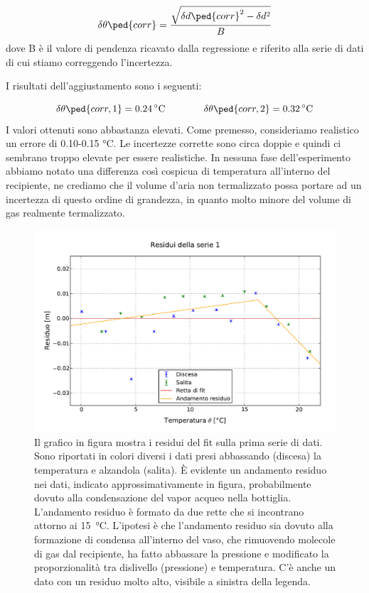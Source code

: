 \begin{equation}
    \delta \theta\ped{corr} = \frac{\sqrt{\delta d\ped{corr}^2 - \delta d^2}}{B}
    \label{eq:corr_err_theta}
\end{equation}
%
dove B è il valore di pendenza ricavato dalla regressione e riferito alla serie di dati di cui stiamo correggendo l'incertezza.

I risultati dell'aggiustamento sono i seguenti:

\begin{equation}
    \delta \theta\ped{corr,1} = \SI{0.24}{\celsius} \qquad \qquad \delta \theta\ped{corr,2} = \SI{0.32}{\celsius}
\end{equation}
%
I valori ottenuti sono abbastanza elevati. Come premesso, consideriamo realistico un errore di 0.10-0.15 \si{\celsius}.
Le incertezze corrette sono circa doppie e quindi ci sembrano troppo elevate per essere realistiche. In nessuna fase
dell'esperimento abbiamo notato una differenza così cospicua di temperatura all'interno del recipiente, ne crediamo che
il volume d'aria non termalizzato possa portare ad un incertezza di questo ordine di grandezza, in quanto molto minore
del volume di gas realmente termalizzato.

\begin{figure}[p]
    \centering
    \includegraphics[width=118mm]{immagini/fit1.pdf}
    \caption{Il grafico in figura mostra i residui del fit sulla prima serie di dati. Sono riportati in colori
    diversi i dati presi abbassando (discesa) la temperatura e alzandola (salita). È evidente un andamento residuo nei dati,
    indicato approssimativamente in figura, probabilmente dovuto alla condensazione del vapor acqueo nella bottiglia. L'andamento
    residuo è formato da due rette che si incontrano attorno ai \SI{15}{\celsius}. L'ipotesi è che l'andamento residuo sia dovuto alla
    formazione di condensa all'interno del vaso, che rimuovendo molecole di gas dal recipiente, ha fatto abbassare la pressione e modificato
    la proporzionalità tra dislivello (pressione) e temperatura. C'è anche
    un dato con un residuo molto alto, visibile a sinistra della legenda.}
    \label{fig:fit1}
\end{figure}


